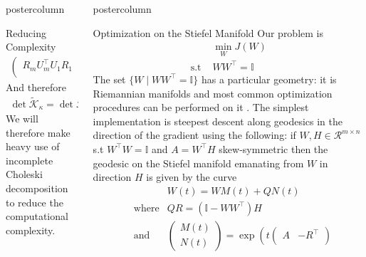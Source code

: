 \documentclass{beamer}
\newlength{\columnheight}
\begin{document}
\begin{frame}
\begin{columns}
\begin{column}{.5\textwidth}
\begin{beamercolorbox}[center]{postercolumn}
\begin{minipage}{.98\textwidth}
{\begin{myblock}{Reducing Complexity}
\begin{align*}
\begin{pmatrix}
								R_m U_m^\intercal U_1 R_1 & R_m U_m^\intercal U_2 R_2 & \cdots & \mathbb{I} \\
							\end{pmatrix}
						\end{align*}
						And therefore
						\begin{align*}
							\det \tilde{\mathcal{K}}_\kappa = \det \mathcal{R}_\kappa
						\end{align*}
						We will therefore make heavy use of incomplete Choleski decomposition to reduce the computational complexity.
					\end{myblock}\vfill
		}\end{minipage}\end{beamercolorbox}
	\end{column}
	\begin{column}{.5\textwidth}
		\begin{beamercolorbox}[center]{postercolumn}
			\begin{minipage}{.98\textwidth} %
				\parbox[t][\columnheight]{\textwidth}{ %
					\begin{myblock}{Optimization on the Stiefel Manifold}
						Our problem is
						\begin{align*}
							&\min_W J(W) \\
							\text{s.t } &W W^\intercal = \mathbb{I}
						\end{align*}
						The set $\{ W \mid W W^\intercal = \mathbb{I} \}$ has a particular geometry: it is Riemannian manifolds and most common optimization procedures can be performed on it \cite{Edelman1998}.
						The simplest implementation is steepest descent along geodesics in the direction of the gradient using the following: if $W, H \in \mathcal{R}^{m \times n}$ s.t $W^\intercal W = \mathbb{I}$ and $A = W^\intercal H$ skew-symmetric then the geodesic on the Stiefel manifold emanating from $W$ in direction $H$ is given by the curve
						\begin{align*}
							& &W (t) = W M (t) + Q N (t) \\
							&\text{where} & QR = (\mathbb{I} - W W^\intercal) H \\
							&\text{and} &\begin{pmatrix}
							 M(t) \\ N(t)
						 \end{pmatrix} = \exp \left( t \begin{pmatrix}
							 A & - R^\intercal \\

\end{pmatrix}
\end{align*}
\end{myblock}}
\end{minipage}
\end{beamercolorbox}
\end{column}
\end{columns}
\end{frame}
\end{document}
